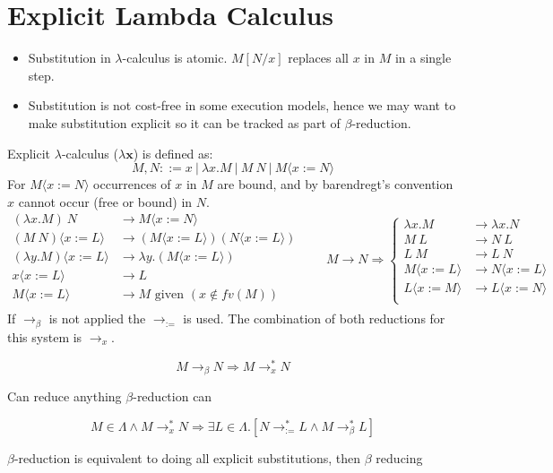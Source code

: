\section{Explicit Lambda Calculus}
\begin{itemize}
	\item Substitution in $\lambda$-calculus is atomic. $M[N/x]$ replaces all $x$ in $M$ in a single step.
	\item Substitution is not cost-free in some execution models, hence we may want to make substitution explicit so it can be tracked as part of $\beta$-reduction.
\end{itemize}
Explicit $\lambda$-calculus ($\lambda \mathbf{x}$) is defined as:
\[M,N ::= x \ | \ \lambda x . M \ | \ M \ N \ | \ M \langle x := N \rangle \]
For $M \langle x := N \rangle$ occurrences of $x$ in $M$ are bound, and by barendregt's convention $x$ cannot occur (free or bound) in $N$.
\[\begin{split}
		(\lambda x . M) \ N & \to M \langle x := N \rangle \\
		(M \ N) \langle x := L \rangle & \to (M \langle x := L \rangle)(N \langle x := L \rangle) \\
		(\lambda y . M)\langle x := L \rangle & \to \lambda y . (M\langle x := L \rangle) \\
		x \langle x := L \rangle & \to L \\
		M \langle x := L \rangle & \to M \text{ given } (x \not\in fv(M)) \\
	\end{split} \qquad M \to N \Rightarrow \begin{cases}
		\lambda x.M              & \to \lambda x.N              \\
		M \ L                    & \to N \ L                    \\
		L \ M                    & \to L \ N                    \\
		M \langle x := L \rangle & \to N \langle x := L \rangle \\
		L \langle x := M \rangle & \to L\langle x := N \rangle  \\
	\end{cases}\]
If $\to_\beta$ is not applied the $\to_{:=}$ is used. The combination of both reductions for this system is $\to_x$.
\\\begin{minipage}[t]{.49\textwidth}
	\[M \to_\beta N \Rightarrow M \to_x^* N\]
	\begin{center}
		Can reduce anything $\beta$-reduction can
	\end{center}
\end{minipage}
\hfill
\begin{minipage}[t]{.49\textwidth}
	\[M \in \Lambda \land M \to_x^* N \Rightarrow \exists L \in \Lambda . [N \to_{:=}^* L \land M \to_\beta^* L]\]
	\begin{center}
		$\beta$-reduction is equivalent to doing all explicit substitutions, then $\beta$ reducing
	\end{center}
\end{minipage}

